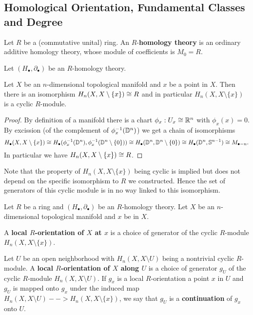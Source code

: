 	\newpage
	\subsection{Homological Orientation, Fundamental Classes and Degree}

	\begin{definition}
		Let $R$ be a (commutative unital) ring. An $R$-\textbf{homology theory} is an ordinary additive homology theory, whose module of coefficients is $M_0 = R$.
	\end{definition}

	\begin{lemma}
		Let $(H_\bullet,\partial_\bullet)$ be an $R$-homology theory.

		Let $X$ be an $n$-dimensional topological manifold and $x$ be a point in $X$. Then there is an isomorphism $H_n(X,X\setminus \{x\}) \cong R$ and in particular $H_n(X,X\setminus \{x\})$ is a cyclic $R$-module.
	\end{lemma}
	\begin{proof}
		By definition of a manifold there is a chart $\phi_x: U_x \cong \mathbb{R}^n$ with $\phi_x(x) = 0$. By excission (of the complement of $\phi_x^{-1}(\mathbb{D}^n)$) we get a chain of isomorphisms
		\begin{equation*}
			H_\bullet(X,X\setminus\{x\}) \cong H_\bullet(\phi_x^{-1}(\mathbb{D}^n),\phi_x^{-1}(\mathbb{D}^n\setminus \{0\})) \cong H_\bullet(\mathbb{D}^n,\mathbb{D}^n\setminus \{0\}) \cong H_\bullet(\mathbb{D}^n,\mathbb{S}^{n-1}) \cong M_{\bullet-n}.
		\end{equation*}
		In particular we have $H_n(X,X\setminus\{x\}) \cong R$. 
	\end{proof}

	\begin{remark}
		Note that the property of $H_n(X,X\setminus \{x\})$ being cyclic is implied but does not depend on the specific isomorphism to $R$ we constructed. Hence the set of generators of this cyclic module is in no way linked to this isomorphism.
	\end{remark}

	\begin{definition}
		Let $R$ be a ring and $(H_\bullet, \partial_\bullet)$ be an $R$-homology theory. Let $X$ be an $n$-dimensional topological manifold and $x$ be in $X$. 

		A \textbf{local $R$-orientation of $X$ at $x$} is a choice of generator of the cyclic $R$-module $H_n(X,X\setminus\{x\})$.

		Let $U$ be an open neighborhood with $H_n(X,X\setminus U)$ being a nontrivial cyclic $R$-module. A \textbf{local $R$-orientation of $X$ along $U$} is a choice of generator $g_U$ of the cyclic $R$-module $H_n(X,X\setminus U)$. If $g_x$ is a local $R$-orientation a point $x$ in $U$ and $g_U$ is mapped onto $g_x$ under the induced map $H_n(X,X\setminus U) --> H_n(X,X\setminus \{x\})$, we say that $g_U$ is a \textbf{continuation} of $g_x$ onto $U$.
	\end{definition}

